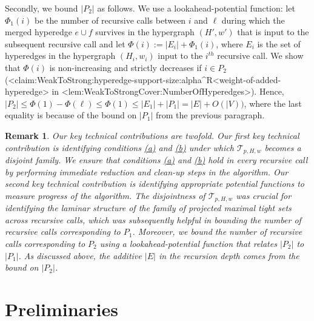 \documentclass{article}
\def\Cref#1{<#1>}%
\newtheorem{remark}{Remark}[section]
\newcommand{\maximalTightSetFamily}[1]{\ensuremath{\calT_{#1}}\xspace}
\newcommand{\kristof}[1]{{\color{purple}[{\tiny Kristof: \bf #1}]\marginpar{\color{red}*}}}
\providecommand{\calT}{\mathcal{T}}
\begin{document}
Secondly, we bound $|P_2|$ as follows. We use a lookahead-potential function: let $\Phi_1(i)$ be the number of recursive calls between $i$ and $\ell$
during which the merged hyperedge $e\cup f$ survives in the hypergraph $(H', w')$ that is input to the subsequent recursive call
and let $\Phi(i):=|E_i|+\Phi_1(i)$, where $E_i$ is the set of hyperedges in the hypergraph $(H_i, w_i)$ input to the $i^{th}$ recursive call. We show that $\Phi(i)$ is non-increasing and strictly decreases if 
$i\in P_2$ 
(\Cref{claim:WeakToStrong:hyperedge-support-size:alpha^R<weight-of-added-hyperedge} in \Cref{lem:WeakToStrongCover:NumberOfHyperedges}). Hence, $|P_2|\le \Phi(1)-\Phi(\ell)\le \Phi(1) \le |E_1|+|P_1|=|E|+O(|V))$, where the last equality is because of the bound on $|P_1|$ from the previous paragraph.  

\begin{remark}
    Our key technical contributions are twofold. Our first key technical contribution is identifying conditions \hyperlink{WeakToStrong(a)}{(a)} and \hyperlink{WeakToStrong(b)}{(b)} under which $\maximalTightSetFamily{p, H, w}$ becomes a disjoint family. We ensure that conditions \hyperlink{WeakToStrong(a)}{(a)} and \hyperlink{WeakToStrong(b)}{(b)} hold in every recursive call by performing \emph{immediate} reduction and clean-up steps in the algorithm. 
    Our second key technical contribution is identifying appropriate potential functions to measure progress of the algorithm. The disjointness of $\maximalTightSetFamily{p, H, w}$ was crucial for identifying the laminar structure of the family of projected maximal tight sets across recursive calls, which was subsequently helpful in bounding the number of recursive calls corresponding to $P_1$. 
    Moreover, we bound the number of recursive calls corresponding to $P_2$ using a lookahead-potential function that relates $|P_2|$ to $|P_1|$. As discussed above, the additive $|E|$ in the recursion depth comes from the bound on $|P_2|$.
\end{remark}
\section{Preliminaries}\label{sec:prelims}
\end{document}
